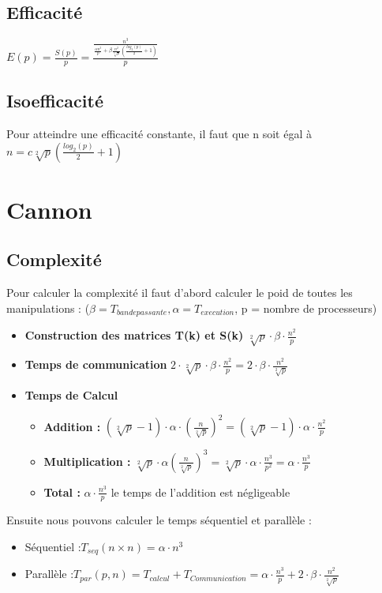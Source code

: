 \documentclass[a4paper]{article}
\begin{document}
\subsection{Efficacité}
$E(p) = \frac{S(p)}{p} = \frac{\frac{n^3}{\frac{\alpha n^3}{p} + \beta \frac{n^2}{\sqrt[2]{p}}(\frac{log_2(p)}{2} + 1)}}{p}$
\subsection{Isoefficacité}
Pour atteindre une efficacité constante, il faut que n soit égal à $n = c\sqrt[2]{p} (\frac{log_2(p)}{2} + 1)$

\newpage

\section{Cannon}

\subsection{Complexité}
Pour calculer la complexité il faut d'abord calculer le poid de toutes les manipulations :\newline
($\beta = T_{bande passante}, \alpha = T_{execution}$, p = nombre de processeurs)
\begin{itemize}
    \item \textbf{Construction des matrices T(k) et S(k)}\newline
    $\sqrt[2]{p} \cdot \beta \cdot \frac{n^2}{p}$
    \item \textbf{Temps de communication}\newline
    $2 \cdot \sqrt[2]{p} \cdot \beta \cdot \frac{n^2}{p} = 2 \cdot \beta \cdot \frac{n^2}{\sqrt[2]{p}}$
    \item \textbf{Temps de Calcul}
    \begin{itemize}
    	\item \textbf{Addition :} $(\sqrt[2]{p}-1) \cdot \alpha \cdot (\frac{n}{\sqrt[2]{p}})^2 = (\sqrt[2]{p}-1) \cdot \alpha \cdot \frac{n^2}{p}$
    	\item \textbf{Multiplication :} $\sqrt[2]{p} \cdot \alpha (\frac{n}{\sqrt[2]{p}})^3 = \sqrt[2]{p} \cdot \alpha \cdot \frac{n^3}{p^2} = \alpha \cdot \frac{n^3}{p}$
    	\item \textbf{Total :} $\alpha \cdot \frac{n^3}{p}$
    	\color{red} \color{red}le temps de l'addition est négligeable
    \end{itemize}
\end{itemize}
Ensuite nous pouvons calculer le temps séquentiel et parallèle :
\begin{itemize}
\item{Séquentiel :}\newline$T_{seq}(n \times n) = \alpha \cdot n^3$\\
\item{Parallèle :}\newline$T_{par}(p,n) = T_{calcul}+T_{Communication} = \alpha \cdot \frac{n^3}{p} + 2 \cdot \beta \cdot \frac{n^2}{\sqrt[2]{p}}$
\end{itemize}
\end{document}
